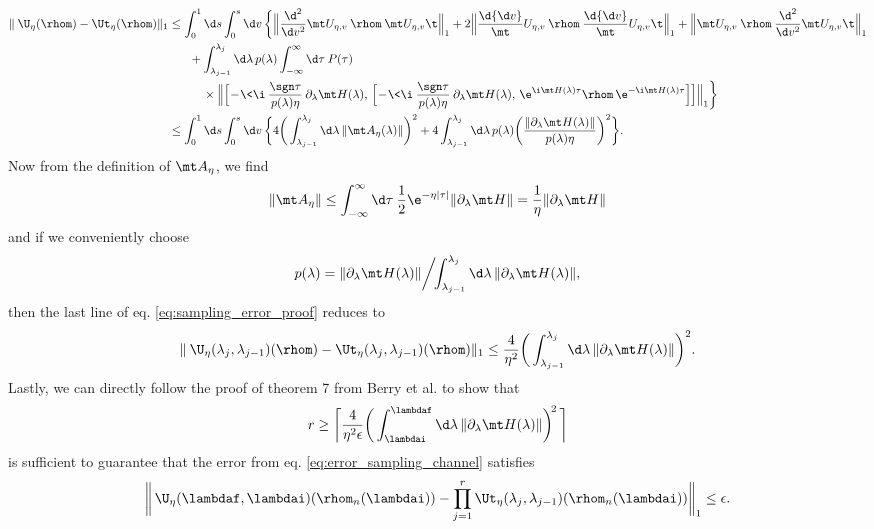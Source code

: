 \begin{align}\label{eq:sampling_error_proof}
    \|\> \U_\eta(\rhom) - \Ut_\eta(\rhom)\|_1 &\leq \int_0^1 \d s \int_0^s \d v \, \bigg\{ \Big\| \frac{\d^2}{\d v^2} \mt U_{\eta, v} \> \rhom \> \mt U_{\eta, v}\t \Big\|_1 + 2 \Big\| \frac\d{\d v} \mt U_{\eta, v} \> \rhom \> \frac\d{\d v} \mt U_{\eta, v}\t \Big\|_1 + \Big\| \mt U_{\eta, v} \> \rhom \> \frac{\d^2}{\d v^2} \mt U_{\eta, v}\t \Big\|_1 \nonumber \\
    &\hspace{6mm} + \int_{\lambda_{j-1}}^{\lambda_j} \d\lambda \, p(\lambda) \int_{-\infty}^\infty \d\tau \> P(\tau) \nonumber \\
    &\hspace{10mm} \times \Big\| \Big[ \!-\!\<\i \> \frac{\sgn\tau}{p(\lambda)\eta} \> \partial_\lambda \mt H(\lambda), \, \Big[ \!-\!\<\i \> \frac{\sgn\tau}{p(\lambda)\eta} \> \partial_\lambda \mt H(\lambda), \, \e^{\i \mt H(\lambda) \tau} \rhom \, \e^{-\i \mt H(\lambda) \tau} \Big] \Big] \Big\|_1 \bigg\} \nonumber \\
    &\leq \int_0^1 \d s \int_0^s \d v \, \bigg\{ 4 \bigg( \int_{\lambda_{j-1}}^{\lambda_j} \d\lambda \, \|\mt A_\eta(\lambda)\|\bigg)^2 + 4 \int_{\lambda_{j-1}}^{\lambda_j} \d\lambda \, p(\lambda) \bigg( \frac{\|\partial_\lambda \mt H(\lambda)\|}{p(\lambda)\eta} \bigg)^2 \bigg\}.
\end{align}
Now from the definition of $\mt A_\eta$, we find
\begin{align}
    \|\mt A_\eta\| \leq \int_{-\infty}^{\infty} \d\tau \> \frac12\e^{-\eta|\tau|} \|\partial_\lambda \mt H\| = \frac1\eta \|\partial_\lambda \mt H\|
\end{align}
and if we conveniently choose
\begin{align}
    p(\lambda) = \|\partial_\lambda \mt H(\lambda)\| \bigg/ \!\! \int_{\lambda_{j-1}}^{\lambda_j} \d\lambda \, \|\partial_\lambda \mt H(\lambda)\|,
\end{align}
then the last line of eq. \ref{eq:sampling_error_proof} reduces to
\begin{align}
    \|\> \U_\eta(\lambda_j, \lambda_{j-1})(\rhom) - \Ut_\eta(\lambda_j, \lambda_{j-1})(\rhom)\|_1 \leq \frac4{\eta^2} \bigg( \int_{\lambda_{j-1}}^{\lambda_j} \d\lambda \, \|\partial_\lambda \mt H(\lambda)\| \bigg)^2.
\end{align}
Lastly, we can directly follow the proof of theorem 7 from Berry et al. \cite{Berry2020} to show that
\begin{align}
    r \geq \bigg\lceil \frac4{\eta^2\epsilon} \bigg( \int_\lambdai^\lambdaf \d\lambda \, \|\partial_\lambda \mt H(\lambda)\| \bigg)^{\!2} \, \bigg\rceil
\end{align}
is sufficient to guarantee that the error from eq. \ref{eq:error_sampling_channel} satisfies
\begin{align}
    \bigg\| \, \U_\eta(\lambdaf, \lambdai)(\rhom_n(\lambdai)) - \prod_{j=1}^r \Ut_\eta(\lambda_j, \lambda_{j-1})(\rhom_n(\lambdai)) \bigg\|_1 \leq \epsilon.
\end{align}

